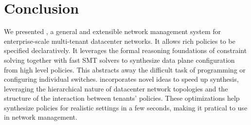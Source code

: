 \section{Conclusion}

We presented \Name, a general and extensible network management system
for enterprise-scale multi-tenant datacenter networks. It allows
rich policies to be specified declaratively. It leverages
the formal reasoning foundations of constraint solving together with
fast SMT solvers to synthesize data plane configuration from high
level policies. This abstracts away the difficult task of programming or
configuring individual switches. \Name incorporates novel ideas to
speed up synthesis, leveraging the hierarchical nature of datacenter
network topologies and the structure of the interaction between
tenants' policies. These optimizations help \Name synthesize policies
for realistic settings in a few seconds, making it pratical to use in
network management.


